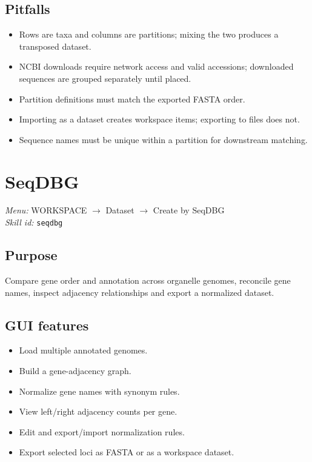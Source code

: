 \documentclass[11pt]{report}
\begin{document}
\subsection{Pitfalls}

\begin{itemize}
  \item Rows are taxa and columns are partitions; mixing the two produces a transposed dataset.
  \item NCBI downloads require network access and valid accessions; downloaded sequences are grouped separately until placed.
  \item Partition definitions must match the exported FASTA order.
  \item Importing as a dataset creates workspace items; exporting to files does not.
  \item Sequence names must be unique within a partition for downstream matching.
\end{itemize}


\section{SeqDBG}
\noindent\textit{Menu:} WORKSPACE $\rightarrow$ Dataset $\rightarrow$ Create by SeqDBG\\
\noindent\textit{Skill id:} \texttt{seqdbg}

\subsection{Purpose}

Compare gene order and annotation across organelle genomes, reconcile gene names, inspect adjacency relationships and export a normalized dataset.

\subsection{GUI features}

\begin{itemize}
  \item Load multiple annotated genomes.
  \item Build a gene-adjacency graph.
  \item Normalize gene names with synonym rules.
  \item View left/right adjacency counts per gene.
  \item Edit and export/import normalization rules.
  \item Export selected loci as FASTA or as a workspace dataset.
\end{itemize}
\end{document}
